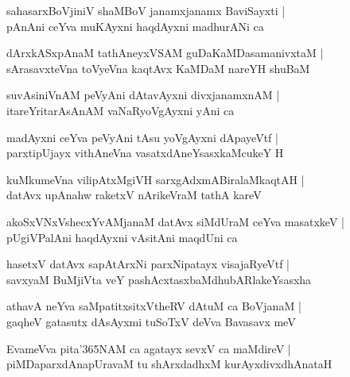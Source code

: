 \begin{shloka}
sahasarxBoVjiniV shaMBoV janamxjanamx BaviSayxti |\\
pAnAni ceYva muKAyxni haqdAyxni madhurANi ca 
\end{shloka}

\begin{shloka}
dArxkASxpAnaM tathAneyxVSAM guDaKaMDasamanivxtaM |\\
sArasavxteVna toVyeVna kaqtAvx KaMDaM nareYH shuBaM
\end{shloka}

\begin{shloka}
suvAsiniVnAM peVyAni dAtavAyxni divxjanamxnAM |\\
itareYritarAsAnAM vaNaRyoVgAyxni yAni ca 
\end{shloka}

\begin{shloka}
madAyxni ceYva peVyAni tAsu yoVgAyxni dApayeVtf |\\
parxtipUjayx vithAneVna vasatxdAneYsasxkaMcukeY H 
\end{shloka}

\begin{shloka}
kuMkumeVna vilipAtxMgiVH sarxgAdxmABiralaMkaqtAH |\\
datAvx upAnahw raketxV nArikeVraM tathA kareV 
\end{shloka}

\begin{shloka}
akoSxVNxVshecxYvAMjanaM datAvx siMdUraM ceYva masatxkeV |\\
pUgiVPalAni haqdAyxni vAsitAni maqdUni ca 
\end{shloka}

\begin{shloka}
hasetxV datAvx sapAtArxNi parxNipatayx visajaRyeVtf |\\
savxyaM BuMjiVta veY pashAcxtasxbaMdhubARlakeYsasxha 
\end{shloka}

\begin{shloka}
athavA neYva saMpatitxsitxVtheRV dAtuM ca BoVjanaM |\\
gaqheV gatasutx dAsAyxmi tuSoTxV deVva Bavasavx meV 
\end{shloka}

\begin{shloka}
EvameVva pita\char'365NAM ca agatayx sevxV ca maMdireV |\\
piMDaparxdAnapUravaM tu shArxdadhxM kurAyxdivxdhAnataH 
\end{shloka}

